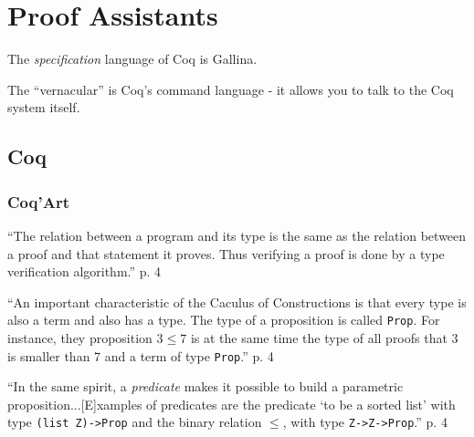 \chapter{Proof Assistants}

The \textit{specification} language of Coq is Gallina.

The ``vernacular'' is Coq's command language - it allows you to talk
to the Coq system itself.

\section{Coq}

\subsection{Coq'Art}

\enquote{The relation between a program and its type is the same as
  the relation between a proof and that statement it proves.  Thus
  verifying a proof is done by a type verification algorithm.} p. 4

\enquote{An important characteristic of the Caculus of Constructions is that
every type is also a term and also has a type.  The type of a
proposition is called \texttt{Prop}.  For instance, they proposition
\(3\leq 7\) is at the same time the type of all proofs that 3 is
smaller than 7 and a term of type \texttt{Prop}.} p. 4

\enquote{In the same spirit, a \textit{predicate} makes it possible to
  build a parametric proposition...[E]xamples of predicates are the
  predicate `to be a sorted list' with type \texttt{(list Z)->Prop}
  and the binary relation \(\leq\), with type \texttt{Z->Z->Prop}.} p. 4
